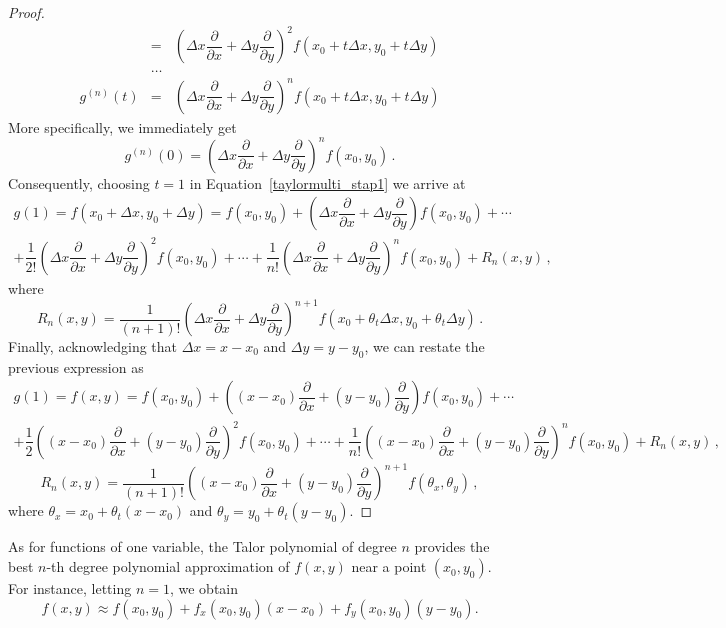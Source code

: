 \begin{proof}
\begin{eqnarray*}
&=&\left(\Delta x\dfrac{\partial}{\partial x}+\Delta y\dfrac{\partial}{\partial y}\right)^2f(x_0+t\Delta x,y_0+t\Delta y)\\[0.2cm]
&\ldots&\\
g^{(n)}(t)&=&\left(\Delta x\dfrac{\partial}{\partial x}+\Delta y\dfrac{\partial}{\partial y}\right)^nf(x_0+t\Delta x,y_0+t\Delta y)
\end{eqnarray*}
More specifically, we immediately get
$$
g^{(n)}(0)=\left(\Delta x\dfrac{\partial}{\partial x}+\Delta y\dfrac{\partial}{\partial y}\right)^nf(x_0,y_0)\,.
$$
Consequently, choosing $t=1$ in Equation~\eqref{taylormulti_stap1} we arrive at 
\begin{multline*}
g(1)=f(x_0+\Delta x,y_0+\Delta y)=f(x_0,y_0)+\left(\Delta x\dfrac{\partial}{\partial x}+\Delta y\dfrac{\partial}{\partial y}\right)f(x_0,y_0)+\cdots\\[0.2cm]
+\dfrac{1}{2!}\left(\Delta x\dfrac{\partial}{\partial x}+\Delta y\dfrac{\partial}{\partial y}\right)^2f(x_0,y_0)+ \cdots +
\dfrac{1}{n!}\left(\Delta x\dfrac{\partial}{\partial x}+\Delta y\dfrac{\partial}{\partial y}\right)^nf(x_0,y_0)+R_n(x,y)\,,
\end{multline*}
where
$$
R_n(x,y)=\dfrac{1}{(n+1)!}\left(\Delta x\dfrac{\partial}{\partial x}+\Delta y\dfrac{\partial}{\partial y}\right)^{n+1}f(x_0+\theta_t\Delta x,y_0+\theta_t\Delta y)\,.
$$
Finally, acknowledging that $\Delta x=x-x_0$ and $\Delta y=y-y_0$, we can restate the previous expression as
\begin{multline*}
g(1)=f(x,y)=f(x_0,y_0)+\left((x-x_0)\dfrac{\partial}{\partial x}+(y-y_0)\dfrac{\partial}{\partial y}\right)f(x_0,y_0)+\cdots\\[0.2cm]
+\dfrac{1}{2}\left((x-x_0)\dfrac{\partial}{\partial x}+(y-y_0)\dfrac{\partial}{\partial y}\right)^2f(x_0,y_0)+ \cdots +
\dfrac{1}{n!}\left((x-x_0)\dfrac{\partial}{\partial x}+(y-y_0)\dfrac{\partial}{\partial y}\right)^nf(x_0,y_0)+R_n(x,y)\,,
\end{multline*}
$$
R_n(x,y)=\dfrac{1}{(n+1)!}\left((x-x_0)\dfrac{\partial}{\partial x}+(y-y_0)\dfrac{\partial}{\partial y}\right)^{n+1}f(\theta_x,\theta_y)\,,
$$
where $\theta_x=x_0+\theta_t(x-x_0)$ and $\theta_y=y_0+\theta_t(y-y_0)$.
\end{proof}

\fi

As for functions of one variable, the Talor polynomial of degree $n$ provides the best $n$-th degree polynomial approximation of $f(x,y)$ near a point $(x_0,y_0)$. For instance, letting $n=1$, we obtain
$$
f(x,y)\approx f(x_0,y_0)+f_x(x_0,y_0)(x-x_0)+f_y(x_0,y_0)(y-y_0).
$$

